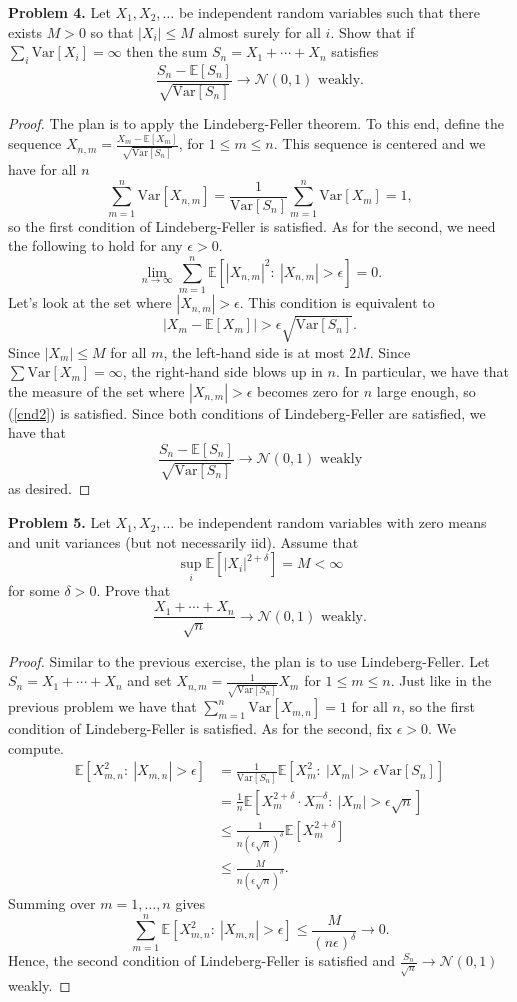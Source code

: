 \documentclass[11pt,letterpaper]{report}
\newcommand{\mcal}[1]{\mathcal{#1}}
\newcommand{\E}{\mathbb{E}}
\newcommand{\Var}{\text{Var}}
\begin{document}
\noindent\textbf{Problem 4. }
Let $X_1, X_2, \ldots$ be independent random variables such that there exists $M>0$ so that $|X_i|\leq M$ almost surely for all $i$. Show that if $\sum_i\Var[X_i] = \infty$ then the sum $S_n = X_1 + \cdots + X_n$ satisfies
\[
\frac{S_n - \E[S_n]}{\sqrt{\Var[S_n]}}\to \mcal{N}(0, 1)\text{ weakly.}
\]
\begin{proof}
	The plan is to apply the Lindeberg-Feller theorem. To this end, define the sequence $X_{n, m} = \frac{X_m - \E[X_m]}{\sqrt{\Var[S_n]}}$, for $1\leq m\leq n$. This sequence is centered and we have for all $n$
	\[
	\sum_{m=1}^n\Var[X_{n,m}] = \frac{1}{\Var[S_n]}\sum_{m=1}^n\Var[X_m] = 1,
	\]
	so the first condition of Lindeberg-Feller is satisfied. As for the second, we need the following to hold for any $\epsilon>0$.
	\begin{equation*}\label{cnd2}
	\lim_{n\to \infty}\sum_{m=1}^n\E[|X_{n, m}|^2:\ |X_{n, m}|>\epsilon] = 0.
	\end{equation*}
	Let's look at the set where $|X_{n, m}|>\epsilon$. This condition is equivalent to 
	\[
	|X_m - \E[X_m]| > \epsilon \sqrt{\Var[S_n]}.
	\]
	Since $|X_m|\leq M$ for all $m$, the left-hand side is at most $2M$. Since $\sum \Var[X_m] = \infty$, the right-hand side blows up in $n$. In particular, we have that the measure of the set where $|X_{n, m}|>\epsilon$ becomes zero for $n$ large enough, so (\ref{cnd2}) is satisfied. Since both conditions of Lindeberg-Feller are satisfied, we have that
	\[
	\frac{S_n - \E[S_n]}{\sqrt{\Var[S_n]}}\to \mcal{N}(0, 1)\text{ weakly}
	\]
	as desired.
\end{proof}

\noindent\textbf{Problem 5. }
Let $X_1, X_2, \ldots$ be independent random variables with zero means and unit variances (but not necessarily iid). Assume that
\[
\sup_{i}\E[|X_i|^{2+\delta}] = M<\infty
\]
for some $\delta>0$. Prove that
\[
\frac{X_1 + \cdots + X_n}{\sqrt{n}}\to \mcal{N}(0, 1)\text{ weakly.}
\]
\begin{proof}
	Similar to the previous exercise, the plan is to use Lindeberg-Feller. Let $S_n = X_1 + \cdots + X_n$ and set $X_{n, m} = \frac{1}{\sqrt{\Var[S_n]}}X_m$ for $1\leq m \leq n$. Just like in the previous problem we have that $\sum_{m=1}^n\Var[X_{m,n}] = 1$ for all $n$, so the first condition of Lindeberg-Feller is satisfied. As for the second, fix $\epsilon>0$. We compute.
	\begin{align*}
		\E[X_{m, n}^2:\ |X_{m, n}|>\epsilon] &= \frac{1}{\Var[S_n]}\E[X_m^2:\ |X_m| > \epsilon \Var[S_n]]\\
		&= \frac{1}{n}\E[X_m^{2+\delta}\cdot X_m^{-\delta}:\ |X_m|>\epsilon\sqrt{n}]\\
		&\leq \frac{1}{n(\epsilon \sqrt{n})^\delta}\E[X_m^{2+\delta}]\\
		&\leq \frac{M}{n(\epsilon\sqrt{n})^\delta}.
	\end{align*}
	Summing over $m = 1, \ldots, n$ gives
	\[
	\sum_{m=1}^n\E[X_{m,n}^2:\ |X_{m, n}|>\epsilon]\leq \frac{M}{(n\epsilon)^\delta}\to 0.
	\]
	Hence, the second condition of Lindeberg-Feller is satisfied and $\frac{S_n}{\sqrt{n}}\to \mcal{N}(0, 1)$ weakly.
\end{proof}
\end{document}
